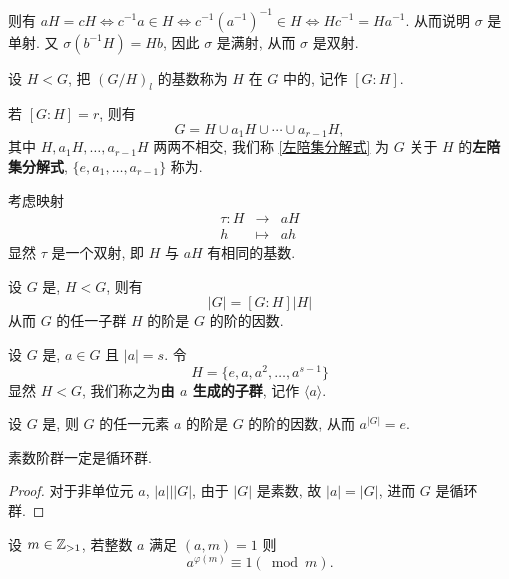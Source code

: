 则有 $aH=cH\Leftrightarrow c^{-1}a\in H\Leftrightarrow c^{-1}(a^{-1})^{-1}\in H\Leftrightarrow Hc^{-1}=Ha^{-1}$. 从而说明 $\sigma$ 是单射. 又 $\sigma(b^{-1}H)=Hb$, 因此 $\sigma$ 是满射, 从而 $\sigma$ 是双射.

\begin{definition}
	\noindent 设 $H<G$, 把 $(G/H)_l$ 的基数称为 $H$ 在 $G$ 中的, 记作 $[G:H]$. 
\end{definition}

若 $[G:H]=r$, 则有 
\begin{equation}\label{左陪集分解式}
	G=H\cup a_1 H\cup\cdots\cup a_{r-1}H,
\end{equation}
其中 $H,a_1H,\ldots,a_{r-1}H$ 两两不相交, 我们称 \eqref{左陪集分解式} 为 $G$ 关于 $H$ 的\textbf{左陪集分解式}, $\{e,a_1,\ldots,a_{r-1}\}$ 称为.

考虑映射 $$\begin{array}{rcl}
	\tau:H &\to& aH \\
	h & \mapsto & ah
\end{array}$$ 显然 $\tau$ 是一个双射, 即 $H$ 与 $aH$ 有相同的基数.

\begin{theorem}[\t{Lagrange} 定理]
	设 $G$ 是, $H<G$, 则有 $$|G|=[G:H]|H|$$ 从而 $G$ 的任一子群 $H$ 的阶是 $G$ 的阶的因数.
\end{theorem}

\begin{definition}
	设 $G$ 是, $a\in G$ 且 $|a|=s$. 令 $$H=\{e,a,a^2,\ldots,a^{s-1}\}$$ 显然 $H<G$, 我们称之为\textbf{由 $a$ 生成的子群}, 记作 $\langle a\rangle$.
\end{definition}

\begin{corollary}
	\noindent 设 $G$ 是, 则 $G$ 的任一元素 $a$ 的阶是 $G$ 的阶的因数, 从而 $a^{|G|}=e$.
\end{corollary}

\begin{corollary}
	\noindent 素数阶群一定是循环群.
\end{corollary}
\begin{proof}
	\noindent 对于非单位元 $a$, $|a|\big| |G|$, 由于 $|G|$ 是素数, 故 $|a|=|G|$, 进而 $G$ 是循环群.
\end{proof}

\begin{theorem}[欧拉定理]
	\noindent 设 $m\in \mathbb Z_{>1}$, 若整数 $a$ 满足 $(a,m)=1$ 则 $$a^{\varphi(m)}\equiv 1 (\bmod m).$$
\end{theorem}

